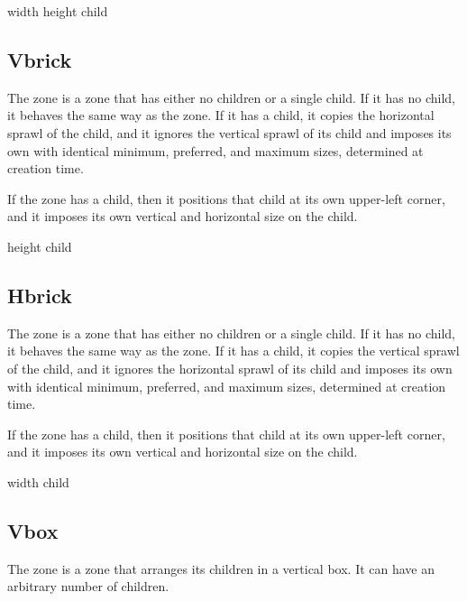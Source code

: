 
 {width height \optional child}

\subsection{Vbrick}
\label{sec-zones-layout-vbrick}

The  zone is a zone that has either no children or a
single child.  If it has no child, it behaves the same way as the
 zone.   If it has a
child, it copies the horizontal sprawl of the child, and it ignores
the vertical sprawl of its child and imposes its own with identical
minimum, preferred, and maximum sizes, determined at creation time.

If the  zone has a child, then it positions that child at
its own upper-left corner, and it imposes its own vertical and
horizontal size on the child.


 {height \optional child}

\subsection{Hbrick}
\label{sec-zones-layout-hbrick}

The  zone is a zone that has either no children or a
single child.  If it has no child, it behaves the same way as the
 zone.   If it has a
child, it copies the vertical sprawl of the child, and it ignores
the horizontal sprawl of its child and imposes its own with identical
minimum, preferred, and maximum sizes, determined at creation time.

If the  zone has a child, then it positions that child at
its own upper-left corner, and it imposes its own vertical and
horizontal size on the child.


 {width \optional child}

\subsection{Vbox}
\label{sec-zones-layout-vbox}

The  zone is a zone that arranges its children in a
vertical box.  It can have an arbitrary number of children.

